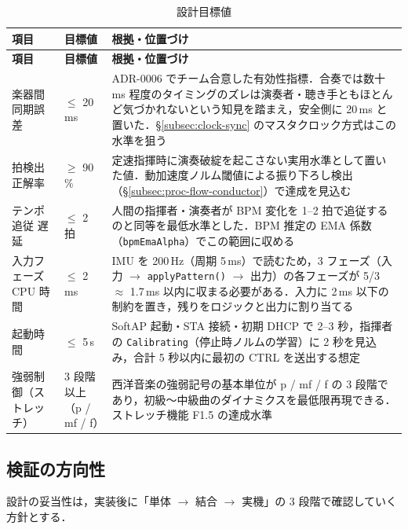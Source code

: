 \documentclass[lualatex,book,paper=a4paper,jafontsize=11.5pt,jafontscale=1.05]{jlreq}
\begin{document}
\begin{longtable}{L{0.20\textwidth} L{0.16\textwidth} L{0.52\textwidth}}
\caption{設計目標値}\label{tab:design-targets}\\
\toprule
\textbf{項目} & \textbf{目標値} & \textbf{根拠・位置づけ} \\
\midrule
\endfirsthead
\toprule
\textbf{項目} & \textbf{目標値} & \textbf{根拠・位置づけ} \\
\midrule
\endhead
楽器間 同期誤差          & $\leq$ 20\,ms          & ADR-0006 でチーム合意した有効性指標．合奏では数十 ms 程度のタイミングのズレは演奏者・聴き手ともほとんど気づかれないという知見を踏まえ，安全側に 20\,ms と置いた．\S\ref{subsec:clock-sync} のマスタクロック方式はこの水準を狙う \\
拍検出 正解率            & $\geq$ 90\,\%          & 定速指揮時に演奏破綻を起こさない実用水準として置いた値．動加速度ノルム閾値による振り下ろし検出（\S\ref{subsec:proc-flow-conductor}）で達成を見込む \\
テンポ追従 遅延          & $\leq$ 2 拍            & 人間の指揮者・演奏者が BPM 変化を 1--2 拍で追従するのと同等を最低水準とした．BPM 推定の EMA 係数（\texttt{bpmEmaAlpha}）でこの範囲に収める \\
入力フェーズ CPU 時間    & $\leq$ 2\,ms           & IMU を 200\,Hz（周期 5\,ms）で読むため，3 フェーズ（入力 $\to$ \texttt{applyPattern()} $\to$ 出力）の各フェーズが 5/3 $\approx$ 1.7\,ms 以内に収まる必要がある．入力に 2\,ms 以下の制約を置き，残りをロジックと出力に割り当てる \\
起動時間                & $\leq$ 5\,s            & SoftAP 起動・STA 接続・初期 DHCP で 2--3 秒，指揮者の \texttt{Calibrating}（停止時ノルムの学習）に 2 秒を見込み，合計 5 秒以内に最初の CTRL を送出する想定 \\
強弱制御（ストレッチ）   & 3 段階以上（p / mf / f）& 西洋音楽の強弱記号の基本単位が p / mf / f の 3 段階であり，初級〜中級曲のダイナミクスを最低限再現できる．ストレッチ機能 F1.5 の達成水準 \\
\bottomrule
\end{longtable}

\subsection{検証の方向性}

設計の妥当性は，実装後に「単体 $\to$ 結合 $\to$ 実機」の 3 段階で確認していく方針とする．
\end{document}
